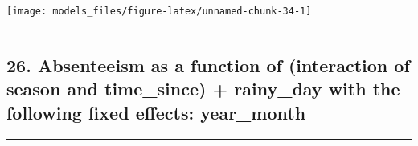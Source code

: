 \documentclass[]{article}
\begin{document}
\begin{center}\texttt{[image: models\_files/figure-latex/unnamed-chunk-34-1]} \end{center}

\newpage

\begin{center}\rule{0.5\linewidth}{\linethickness}\end{center}

\subsection{26. Absenteeism as a function of (interaction of season and
time\_since) + rainy\_day with the following fixed effects:
year\_month}\label{absenteeism-as-a-function-of-interaction-of-season-and-time_since-rainy_day-with-the-following-fixed-effects-year_month}

\begin{center}\rule{0.5\linewidth}{\linethickness}\end{center}
\end{document}
